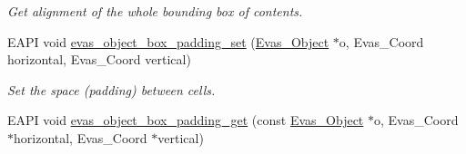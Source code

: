 \begin{DoxyCompactItemize}
\begin{DoxyCompactList}\small\item\em Get alignment of the whole bounding box of contents. \item\end{DoxyCompactList}\item 
EAPI void \hyperlink{group__Evas__Object__Box_ga75ab3d2f84c328010c26a6b8d89c9c67}{evas\_\-object\_\-box\_\-padding\_\-set} (\hyperlink{group__Evas__Object__Group_ga9e19e6dd1f517a0ba437c0114d3e7c97}{Evas\_\-Object} $\ast$o, Evas\_\-Coord horizontal, Evas\_\-Coord vertical)\label{group__Evas__Object__Box_ga75ab3d2f84c328010c26a6b8d89c9c67}

\begin{DoxyCompactList}\small\item\em Set the space (padding) between cells. \item\end{DoxyCompactList}\item 
EAPI void \hyperlink{group__Evas__Object__Box_gab24383f3b29c8bc78c98cd0b0f16902d}{evas\_\-object\_\-box\_\-padding\_\-get} (const \hyperlink{group__Evas__Object__Group_ga9e19e6dd1f517a0ba437c0114d3e7c97}{Evas\_\-Object} $\ast$o, Evas\_\-Coord $\ast$horizontal, Evas\_\-Coord $\ast$vertical)\label{group__Evas__Object__Box_gab24383f3b29c8bc78c98cd0b0f16902d}


\end{DoxyCompactItemize}
